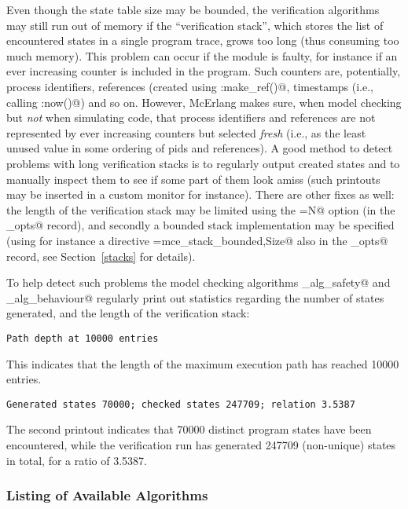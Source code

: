 \documentclass[a4paper]{article}
\begin{document}
Even though the state table size may be bounded, the verification
algorithms may still run out of memory if the ``verification stack'',
which stores the list of encountered states in a single program trace,
grows too long (thus consuming too much memory).  This problem can
occur if the module is faulty, for instance if an ever increasing
counter is included in the program. Such counters are, potentially,
process identifiers, references (created using
\lstinline@erlang:make_ref()@, timestamps (i.e., calling
\lstinline@erlang:now()@) and so on. However, McErlang makes sure,
when model checking but {\em not} when simulating code, that process
identifiers and references are not represented by ever increasing
counters but selected {\em fresh} (i.e., as the least unused value in
some ordering of pids and references).  A good method to detect
problems with long verification stacks is to regularly output created
states and to manually inspect them to see if some part of them look
amiss (such printouts may be inserted in a custom monitor for
instance).  There are other fixes as well: the length of the
verification stack may be limited using the \lstinline@pathLimit=N@
option (in the \lstinline@mce_opts@ record), and secondly a bounded
stack implementation may be specified (using for instance a directive
\lstinline@stack={mce_stack_bounded,Size}@ also in the
\lstinline@mce_opts@ record, see Section~\ref{stacks} for details).

To help detect such problems the model checking algorithms
\lstinline@mce_alg_safety@ and \lstinline@mce_alg_behaviour@ regularly
print out statistics regarding the number of states generated, and the
length of the verification stack:
\begin{lstlisting}
Path depth at 10000 entries
\end{lstlisting}
This indicates that the length of the maximum execution path has reached
10000 entries.

\begin{lstlisting}
Generated states 70000; checked states 247709; relation 3.5387
\end{lstlisting}
The second printout indicates that 70000 distinct program states have
been encountered, while the verification run has generated 247709 (non-unique)
states in total, for a ratio of 3.5387.

\subsubsection{Listing of Available Algorithms}
\end{document}
